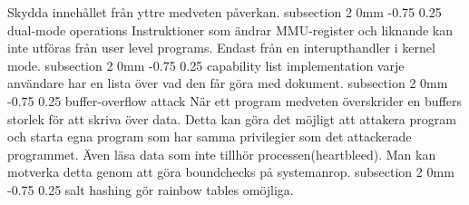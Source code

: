 \documentclass[a4paper,11pt]{article}
\makeatletter
\renewcommand{\subsection}{\@startsection
   {subsection}%
   {2}%
   {0mm}%
   {-0.75\baselineskip}%
   {0.25\baselineskip}%
   {\rmfamily\normalfont\slshape\normalsize}}%
\makeatother
\begin{document}
Skydda innehållet från yttre medveten påverkan.
\subsection{dual-mode operations}
Instruktioner som ändrar MMU-register och liknande kan inte utföras från user level programs. Endast från en interupthandler i kernel mode.
\subsection{capability list implementation}
varje användare har en lista över vad den får göra med dokument. 
\subsection{buffer-overflow attack}
När ett program medveten överskrider en buffers storlek för att skriva över data. Detta kan göra det möjligt
att attakera program och starta egna program som har samma privilegier som det attackerade programmet. Även läsa data som inte tillhör processen(heartbleed). Man kan motverka detta genom att göra boundchecks på systemanrop.
\subsection{salt hashing}
gör rainbow tables omöjliga.

 
\end{document}
